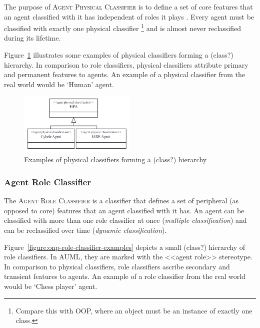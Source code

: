 The purpose of \textsc{Agent Physical Classifier} is to define a set of core features that an agent classified with it has independent of roles it plays \cite{Odell05}.
Every agent must be classified with exactly one physical classifier \footnote{Compare this with OOP, where an object must be an instance of exactly one class.} and is almost never reclassified during its lifetime.

Figure~\ref{figure:onp-physical-classifier-examples} illustrates some examples of physical classifiers forming a (class?) hierarchy.
In comparison to role classifiers, physical classifiers attribute primary and permanent features to agents.
An example of a physical classifier from the real world would be `Human' agent.

\begin{figure}[ht]
	\centering
	\includegraphics[width=0.5\textwidth]{images/onp-physical-classifier-examples.png}
	\caption{Examples of physical classifiers forming a (class?) hierarchy}
	\label{figure:onp-physical-classifier-examples}
\end{figure}

\subsubsection*{Agent Role Classifier}

The \textsc{Agent Role Classifier} is a classifier that defines a set of peripheral (as opposed to core) features that an agent classified with it has.
An agent can be classified with more than one role classifier at once (\textit{multiple classification}) and can be reclassified over time (\textit{dynamic classification}).

Figure~\ref{figure:onp-role-classifier-examples} depicts a small (class?) hierarchy of role classifiers.
In AUML, they are marked with the <<agent role>> stereotype.
In comparison to physical classifiers, role classifiers ascribe secondary and transient features to agents.
An example of a role classifier from the real world would be `Chess player' agent.

